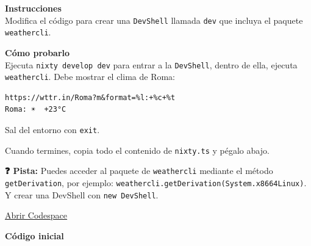 \textbf{Instrucciones}\\
Modifica el código para crear una \texttt{DevShell} llamada \texttt{dev} que incluya el paquete \texttt{weathercli}.

\textbf{Cómo probarlo}\\
Ejecuta \texttt{nixty develop dev} para entrar a la \texttt{DevShell}, dentro de ella, ejecuta \texttt{weathercli}. Debe mostrar el clima de Roma:

\begin{bloquecodigo}
\begin{lstlisting}
https://wttr.in/Roma?m&format=%l:+%c+%t
Roma: ☀️  +23°C
\end{lstlisting}
\end{bloquecodigo}

Sal del entorno con \texttt{exit}.

Cuando termines, copia todo el contenido de \texttt{nixty.ts} y pégalo abajo.

\textbf{❓ Pista:} Puedes acceder al paquete de \texttt{weathercli} mediante el método \texttt{getDerivation}, por ejemplo: \texttt{weathercli.\allowbreak{}getDerivation(System.\allowbreak{}x86\textunderscore{}\allowbreak{}64Linux)}. Y crear una DevShell con \texttt{new DevShell}.

\href{https://codespaces.new/DanielRasho/Thesis-codespaces?quickstart=1&devcontainer_path=.devcontainer/nixty/devcontainer.json}{\underline{Abrir Codespace}}

\textbf{Código inicial}

